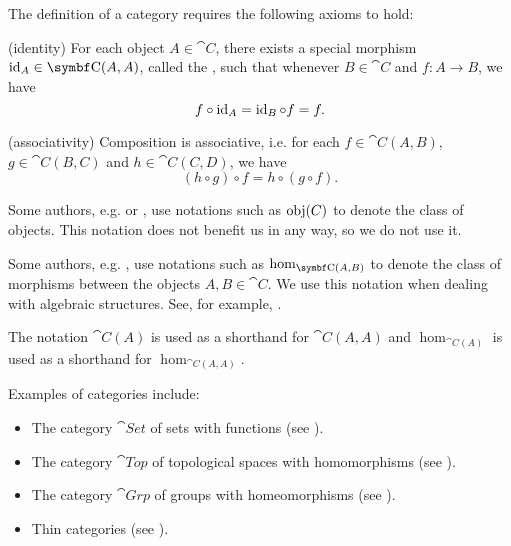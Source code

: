 \begin{definition}
  The definition of a category requires the following axioms to hold:
  \begin{defenum}[resume=def:category]
    (identity) For each object \( A \in \cat{C} \), there exists a special morphism \( \id_A \in \cat{C}(A, A) \), called the , such that whenever \( B \in \cat{C} \) and \( f: A \to B \), we have
    \begin{equation*}
      f \circ \operatorname{id}_A = \operatorname{id}_B \circ f = f.
    \end{equation*}

    (associativity) Composition is associative, i.e. for each \( f \in \cat{C}(A, B) \), \( g \in \cat{C}(B, C) \) and \( h \in \cat{C}(C, D) \), we have
    \begin{equation*}
      (h \circ g) \circ f = h \circ (g \circ f).
    \end{equation*}
  \end{defenum}
\end{definition}

\begin{remark}\label{rem:category_obj_hom}
  Some authors, e.g. \cite{Leinster2014} or \cite{Aluffi2009}, use notations such as \( \operatorname{obj}(C) \) to denote the class of objects. This notation does not benefit us in any way, so we do not use it.

  Some authors, e.g. \cite{MacLane1994}, use notations such as \( \op{hom}_{\cat{C}(A, B)} \) to denote the class of morphisms between the objects \( A, B \in \cat{C} \). We use this notation when dealing with algebraic structures. See, for example, .

  The notation \( \cat{C}(A) \) is used as a shorthand for \( \cat{C}(A, A) \) and \( \hom_{\cat{C}(A)} \) is used as a shorthand for \( \hom_{\cat{C}(A, A)} \).
\end{remark}

\begin{example}\label{ex:categories}
  Examples of categories include:

  \begin{itemize}
    \item The category \( \cat{Set} \) of sets with functions (see ).
    \item The category \( \cat{Top} \) of topological spaces with homomorphisms (see ).
    \item The category \( \cat{Grp} \) of groups with homeomorphisms (see ).
    \item Thin categories (see ).
  \end{itemize}
\end{example}

